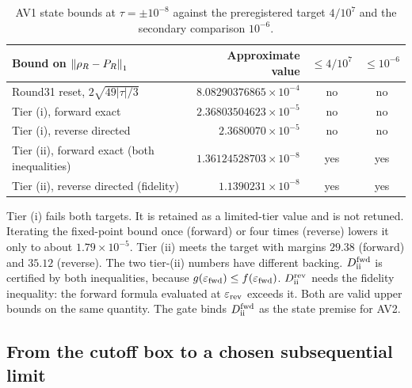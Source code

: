 \begin{table}[htbp]
\centering\small
\caption{AV1 state bounds at $\tau=\pm10^{-8}$ against the preregistered target
$4/10^7$ and the secondary comparison $10^{-6}$.}
\label{tab:av1-tiers}
\begin{tabular}{lrcc}
\toprule
Bound on $\left\lVert\rho_R-P_R\right\rVert_1$ & Approximate value & $\le4/10^7$ & $\le10^{-6}$\\
\midrule
Round31 reset, $2\sqrt{49|\tau|/3}$ & $8.08290376865\times10^{-4}$ & no & no\\
Tier (i), forward exact & $2.36803504623\times10^{-5}$ & no & no\\
Tier (i), reverse directed & $2.3680070\times10^{-5}$ & no & no\\
Tier (ii), forward exact (both inequalities) & $1.36124528703\times10^{-8}$ & yes & yes\\
Tier (ii), reverse directed (fidelity) & $1.1390231\times10^{-8}$ & yes & yes\\
\bottomrule
\end{tabular}
\end{table}

Tier (i) fails both targets. It is retained as a limited-tier value and is not
retuned. Iterating the fixed-point bound once (forward) or four times
(reverse) lowers it only to about $1.79\times10^{-5}$. Tier (ii) meets the
target with margins $29.38$ (forward) and $35.12$ (reverse). The two tier-(ii)
numbers have different backing. $D_{\rm ii}^{\rm fwd}$ is certified by both
inequalities, because $g(\varepsilon_{\rm fwd})\le f(\varepsilon_{\rm fwd})$.
$D_{\rm ii}^{\rm rev}$ needs the fidelity inequality: the forward formula
evaluated at $\varepsilon_{\rm rev}$ exceeds it. Both are valid upper bounds
on the same quantity. The gate binds $D_{\rm ii}^{\rm fwd}$ as the state
premise for AV2.

\subsection{From the cutoff box to a chosen subsequential limit}
\label{sec:av1-passage}
